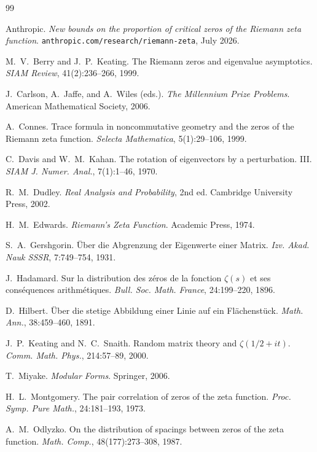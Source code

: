 \documentclass[11pt,a4paper]{article}
\theoremstyle{definition}
\begin{document}
\begin{thebibliography}{99}

Anthropic.
\emph{New bounds on the proportion of critical zeros of the Riemann
zeta function}.
\texttt{anthropic.com/research/riemann-zeta}, July 2026.

M.~V.~Berry and J.~P.~Keating.
The Riemann zeros and eigenvalue asymptotics.
\emph{SIAM Review}, 41(2):236--266, 1999.

J.~Carlson, A.~Jaffe, and A.~Wiles (eds.).
\emph{The Millennium Prize Problems}.
American Mathematical Society, 2006.

A.~Connes.
Trace formula in noncommutative geometry and the zeros of the Riemann
zeta function.
\emph{Selecta Mathematica}, 5(1):29--106, 1999.

C.~Davis and W.~M.~Kahan.
The rotation of eigenvectors by a perturbation. III.
\emph{SIAM J. Numer. Anal.}, 7(1):1--46, 1970.

R.~M.~Dudley.
\emph{Real Analysis and Probability}, 2nd ed.
Cambridge University Press, 2002.

H.~M.~Edwards.
\emph{Riemann's Zeta Function}.
Academic Press, 1974.

S.~A.~Gershgorin.
\"{U}ber die Abgrenzung der Eigenwerte einer Matrix.
\emph{Izv. Akad. Nauk SSSR}, 7:749--754, 1931.

J.~Hadamard.
Sur la distribution des z\'{e}ros de la fonction $\zeta(s)$ et ses
cons\'{e}quences arithm\'{e}tiques.
\emph{Bull. Soc. Math. France}, 24:199--220, 1896.

D.~Hilbert.
\"{U}ber die stetige Abbildung einer Linie auf ein Fl\"{a}chenst\"{u}ck.
\emph{Math. Ann.}, 38:459--460, 1891.

J.~P.~Keating and N.~C.~Snaith.
Random matrix theory and $\zeta(1/2 + it)$.
\emph{Comm. Math. Phys.}, 214:57--89, 2000.

T.~Miyake.
\emph{Modular Forms}.
Springer, 2006.

H.~L.~Montgomery.
The pair correlation of zeros of the zeta function.
\emph{Proc. Symp. Pure Math.}, 24:181--193, 1973.

A.~M.~Odlyzko.
On the distribution of spacings between zeros of the zeta function.
\emph{Math. Comp.}, 48(177):273--308, 1987.


\end{thebibliography}
\end{document}
